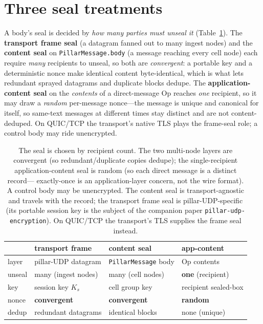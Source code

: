 \documentclass[10pt,twocolumn]{article}
\newcommand{\code}[1]{\texttt{\small #1}}
\begin{document}
\section{Three seal treatments}
A body's seal is decided by \emph{how many parties must unseal it}
(Table~\ref{tab:seals}). The \textbf{transport frame seal} (a datagram fanned out to
many ingest nodes) and the \textbf{content seal} on \code{PillarMessage.body} (a
message reaching every cell node) each require \emph{many} recipients to unseal, so
both are \emph{convergent}: a portable key and a deterministic nonce make identical
content byte-identical, which is what lets redundant sprayed datagrams and duplicate
blocks dedupe. The \textbf{application-content seal} on the \emph{contents} of a
direct-message Op reaches \emph{one} recipient, so it may draw a \emph{random}
per-message nonce---the message is unique and canonical for itself, so same-text
messages at different times stay distinct and are not content-deduped. On QUIC/TCP
the transport's native TLS plays the frame-seal role; a control body may ride
unencrypted.

\begin{table}[t]
\footnotesize
\setlength{\tabcolsep}{3pt}
\begin{tabular}{@{}p{}p{}p{}p{}@{}}
\toprule
 & \textbf{transport frame} & \textbf{content seal} & \textbf{app-content} \\
\midrule
layer     & pillar-UDP datagram & \code{PillarMessage} body & Op contents \\
unseal    & many (ingest nodes) & many (cell nodes) & \textbf{one} (recipient) \\
key       & session key $K_s$ & cell group key & recipient sealed-box \\
nonce     & \textbf{convergent} & \textbf{convergent} & \textbf{random} \\
dedup     & redundant datagrams & identical blocks & none (unique) \\
\bottomrule
\end{tabular}
\caption{The seal is chosen by recipient count. The two multi-node layers are
convergent (so redundant/duplicate copies dedupe); the single-recipient
application-content seal is random (so each direct message is a distinct record—
exactly-once is an application-layer concern, not the wire format). A control body
may be unencrypted. The content seal is transport-agnostic and travels with the record;
the transport frame seal is
pillar-UDP-specific (its portable session key is the subject of the companion
paper \code{pillar-udp-encryption}). On QUIC/TCP the transport's TLS supplies the
frame seal instead.}
\label{tab:seals}
\end{table}
\end{document}
